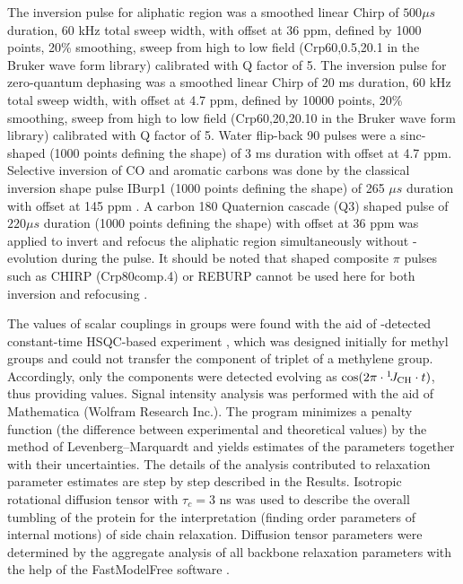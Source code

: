 \documentclass[twocolumn]{svjour3}           %
\begin{document}
The inversion pulse for \clab{} aliphatic region was a smoothed
linear Chirp of $500 \mu s$ duration, 60 kHz total sweep width, with 
offset at 36 ppm, defined by 1000 points, 20\% smoothing, sweep from 
high to low field (Crp60,0.5,20.1 in the Bruker wave form library)
\cite{kupce_optimized_1996,fu_broadband_1995}
calibrated with Q factor of 5. The inversion pulse for \hlab{} zero-quantum dephasing \cite{thrippleton_elimination_2003,harris_zero-quantum_2011} was a smoothed linear Chirp of 20 ms duration, 60 kHz total sweep width, with 
offset at 4.7 ppm, defined by 10000 points, 20\% smoothing, sweep from 
high to low field (Crp60,20,20.10 in the Bruker wave form library) calibrated with Q factor of 5. Water \hlab{} flip-back 90\degree{} pulses were a sinc-shaped \cite{cavanagh_protein_2007} (1000 points defining the shape) of 3 ms duration with offset at 4.7 ppm. Selective inversion of CO and aromatic carbons was done by the classical inversion shape pulse IBurp1 (1000 points defining the shape) of 265 $\mu s$ duration with offset at 145 ppm
\cite{geen_band-selective_1991,vincent_chapter_1997}.
 A carbon 180\degree{} Quaternion cascade (Q3) shaped pulse of 
 $220 \mu s$ duration (1000 points defining the shape) with offset at 
 36 ppm  \cite{emsley_optimization_1992,vincent_chapter_1997}
 was applied to invert and refocus the aliphatic region simultaneously
 without \oneJch{}-evolution \cite{lescop_guidelines_2010}
 during the pulse. It should be noted that shaped composite $\pi$ pulses
 such as CHIRP (Crp80comp.4) \cite{hwang_broadband_1997}
 or REBURP \cite{geen_band-selective_1991}
 cannot be used here for both inversion and refocusing \cite{xia_enhancing_2017}.

The values of \oneJxh{} scalar couplings in \XHtwo{} groups were 
found with the aid of \hlab-detected constant-time {HSQC}-based 
experiment \cite{zhang_probing_2006,lesovoy_nmr_2017}, which was 
designed initially for methyl groups and could not transfer the 
\qinner{} component of \clab{} triplet \TermInner{}
of a methylene group. Accordingly, only the \qouter{} \TermOuter{}
components were detected evolving as 
$\cos(2\pi \cdot {\ensuremath{^1\!J_\text{CH}}} \cdot t)$, thus providing \oneJch{} 
values. Signal intensity analysis was performed with the aid of 
Mathematica (Wolfram Research Inc.). The program minimizes a penalty 
function (the difference between experimental and theoretical values) 
by the method of Levenberg–Marquardt \cite{press_chapter_1992} and 
yields estimates of the parameters together with their uncertainties. 
The details of the analysis contributed to \gtwoXH{} relaxation 
parameter estimates are step by step described in the Results. 
Isotropic rotational diffusion tensor with $\tau_c = 3$ ns was used to 
describe the overall tumbling of the protein for the interpretation 
(finding order parameters of internal motions) of side chain relaxation. 
Diffusion tensor parameters were determined by the aggregate analysis of 
all backbone \nlab{} relaxation parameters with the help of the 
FastModelFree software \cite{cole_fast-modelfree_2003}. 
\end{document}
